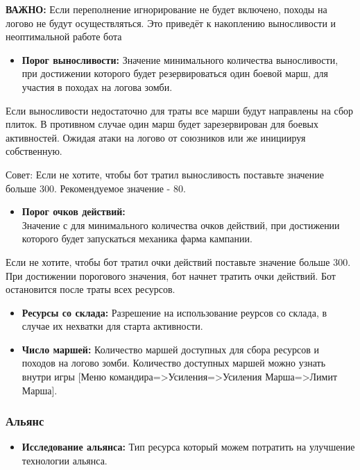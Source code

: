 \documentclass[
]{article}
\providecommand{\tightlist}{%
  \setlength{\itemsep}{0pt}\setlength{\parskip}{0pt}}
\begin{document}
\textbf{{ВАЖНО:}} Если переполнение игнорирование не будет включено,
походы на логово не будут осуществляться. Это приведёт к накоплению
выносливости и неоптимальной работе бота

\begin{itemize}
\tightlist
\item
  \textbf{Порог выносливости:} Значение минимального количества
  выносливости, при достижении которого будет резервироваться один
  боевой марш, для участия в походах на логова зомби.
\end{itemize}

Если выносливости недостаточно для траты все марши будут направлены на
сбор плиток. В противном случае один марш будет зарезервирован для
боевых активностей. Ожидая атаки на логово от союзников или же инициируя
собственную.

Совет: Если не хотите, чтобы бот тратил выносливость поставьте значение
больше 300. Рекомендуемое значение - 80.

\begin{itemize}
\tightlist
\item
  \textbf{Порог очков действий:}\\
  Значение с для минимального количества очков действий, при достижении
  которого будет запускаться механика фарма кампании.
\end{itemize}

Если не хотите, чтобы бот тратил очки действий поставьте значение больше
300. При достижении порогового значения, бот начнет тратить очки
действий. Бот остановится после траты всех ресурсов.

\begin{itemize}
\item
  \textbf{Ресурсы со склада:} Разрешение на использование реурсов со
  склада, в случае их нехватки для старта активности.
\item
  \textbf{Число маршей:} Количество маршей доступных для сбора ресурсов
  и походов на логово зомби. Количество доступных маршей можно узнать
  внутри игры {[}Меню
  командира=\textgreater Усиления=\textgreater Усиления
  Марша=\textgreater Лимит Марша{]}.
\end{itemize}

\subsubsection{Альянс}\label{ux430ux43bux44cux44fux43dux441-1}

\begin{itemize}
\tightlist
\item
  \textbf{Исследование альянса:} Тип ресурса который можем потратить на
  улучшение технологии альянса.
\end{itemize}
\end{document}
